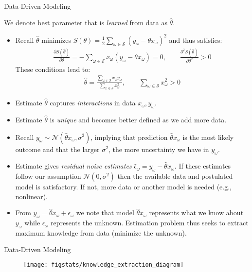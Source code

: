 \documentclass[9pt]{beamer}
\begin{document}
%
\begin{frame}{Data-Driven Modeling}

We denote best parameter that is {\em learned} from data as $\hat{\theta}$. 
\begin{itemize}
\setlength{\itemsep}{5pt}
\item Recall $\hat{\theta}$ minimizes $S(\theta)=\frac{1}{2}\sum_{\omega \in \mathcal{S}} (y_\omega-\theta x_\omega)^2$ and thus satisfies:
\begin{align*}
\frac{\partial S(\hat{\theta})}{\partial \theta}=-\sum_{\omega \in \mathcal{S}}x_\omega (y_\omega-\theta x_\omega)=0,\qquad  \frac{\partial^2 S(\hat{\theta})}{\partial \theta^2}>0
\end{align*}
These conditions lead to:
\begin{align*}
\hat{\theta}=\frac{\sum_{\omega \in \mathcal{S}}x_\omega y_\omega}{\sum_{\omega \in \mathcal{S}}x_\omega^2},\qquad \sum_{\omega \in \mathcal{S}}x_\omega^2>0 
\end{align*}
\item Estimate $\hat{\theta}$ captures {\em interactions} in data $x_\omega,y_\omega$. 
\item Estimate $\hat{\theta}$ is {\em unique} and becomes better defined as we add more data. 
\item Recall $y_\omega \sim \mathcal{N}(\hat{\theta} x_\omega,\sigma^2)$, implying that prediction $\hat{\theta} x_\omega$ is the most likely outcome and that the larger $\sigma^2$, the more uncertainty we have in $y_\omega$. 
\item Estimate gives {\em residual noise estimates} $\hat{\epsilon}_\omega =y_\omega-\hat{\theta}x_\omega$. If these estimates follow our assumption $\mathcal{N}(0,\sigma^2)$ then the available data and postulated model is satisfactory. If not, more data or another model is needed (e.g., nonlinear). 

\item From $y_\omega=\hat{\theta}x_\omega+\epsilon_\omega$ we note that model $\hat{\theta}x_\omega$ represents what we know about $y_\omega$ while $\epsilon_\omega$ represents the unknown. Estimation problem thus seeks to extract maximum knowledge from data (minimize the unknown). 
\end{itemize}
\end{frame}

%
\begin{frame}{Data-Driven Modeling}

\begin{figure}[!htb]
    \centering
	\texttt{[image: figstats/knowledge\_extraction\_diagram]}
\end{figure}

\end{frame}
\end{document}

